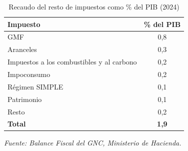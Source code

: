 \begin{table}[h!]
\centering
\caption{Recaudo del resto de impuestos como \% del PIB (2024)}
\label{tab:othertaxes}
\begin{tabular}{l c}
\hline
\textbf{Impuesto} & \textbf{\% del PIB} \\
\hline
GMF & 0,8 \\
Aranceles & 0,3 \\
Impuestos a los combustibles y al carbono & 0,2 \\
Impoconsumo & 0,2 \\
Régimen SIMPLE & 0,1 \\
Patrimonio & 0,1 \\
Resto & 0,2 \\
\hline
\textbf{Total} & \textbf{1,9} \\
\hline
\end{tabular}
\vspace{0.1cm}
\par \footnotesize{\textit{Fuente: Balance Fiscal del GNC, Ministerio de Hacienda.}}
\end{table}

